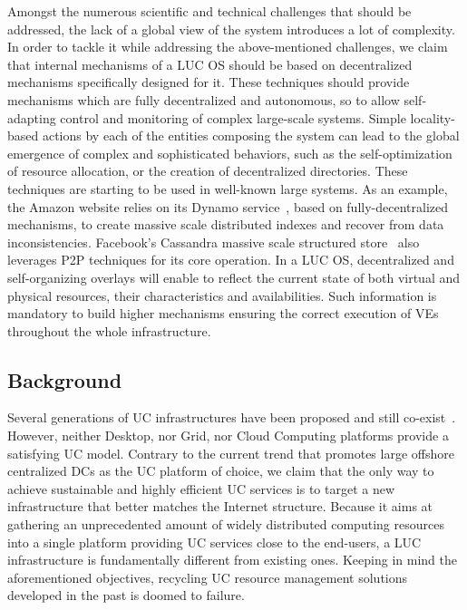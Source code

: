 \documentclass[11pt,a4paper,twoside]{article}
\begin{document}
Amongst the numerous scientific and technical challenges that should be addressed, 
the lack of a global view of the system introduces a lot
of complexity. In order to tackle it while addressing the above-mentioned
challenges, we claim that internal mechanisms of a LUC OS should be based
on decentralized mechanisms specifically designed for it.
These techniques should provide mechanisms which are fully decentralized and
autonomous, so to allow self-adapting control and monitoring of complex
large-scale systems. Simple locality-based actions by each of the entities
composing the system can lead to the global emergence of complex and
sophisticated behaviors, such as the self-optimization of resource allocation,
or the creation of decentralized directories. These techniques are starting to
be used in well-known large systems. As an example, the Amazon website relies on
its Dynamo service~\cite{decandia:2007}, based on fully-decentralized
mechanisms, to create massive scale distributed indexes and recover from data
inconsistencies. Facebook’s Cassandra massive scale structured
store~\cite{lakshman:2010} also leverages P2P techniques for its core
operation. 
%
In a LUC OS, decentralized and self-organizing overlays will enable to reflect
the current state of both virtual and physical resources, their characteristics and
availabilities. Such information is mandatory to build higher mechanisms ensuring the correct execution of VEs throughout 
the whole infrastructure. 



\subsection{Background\label{sec:background}}

Several generations of UC infrastructures have been proposed and still
co-exist~\cite{foster:2011}. However, neither Desktop, nor Grid, nor Cloud Computing
platforms provide a satisfying UC model.  Contrary to the current trend that promotes
large offshore centralized DCs as the UC platform of choice, we claim that the only way to
achieve sustainable and highly efficient UC services is to target a new infrastructure
that better matches the Internet structure.  Because it aims at gathering an unprecedented
amount of widely distributed computing resources into a single platform providing UC
services close to the end-users, a LUC infrastructure is fundamentally different from
existing ones.  Keeping in mind the aforementioned objectives, recycling UC resource
management solutions developed in the past is doomed to failure.
\end{document}
